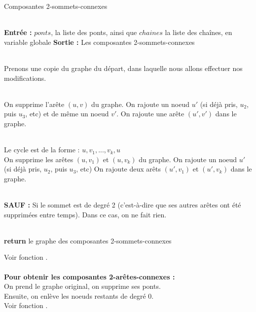 \documentclass{article}      %
\begin{document}
\begin{algorithm}[H] \caption{Composantes 2-sommets-connexes}
\begin{algorithmic}

\\ \State \textbf{Entrée :} $ponts$, la liste des ponts, ainsi que $chaines$ la liste des chaînes, en variable globale
\State \textbf{Sortie :} Les composantes 2-sommets-connexes

\\ \State Prenons une copie du graphe du départ, dans laquelle nous allons effectuer nos modifications.

\\ 
    \State On supprime l'arête $(u, v)$ du graphe.
    \State On rajoute un noeud $u'$ (si déjà pris, $u_2$, puis $u_3$, etc) et de même un noeud $v'$.
    \State On rajoute une arête $(u', v')$ dans le graphe.
\EndFor

\\ 
    \State Le cycle est de la forme : $u, v_1, ..., v_k, u$
    \\\State On supprime les arêtes $(u, v_1)$ et $(u, v_k)$ du graphe.        
    \State On rajoute un noeud $u'$ (si déjà pris, $u_2$, puis $u_3$, etc)
    \State On rajoute deux arêts $(u', v_1)$ et $(u', v_k)$ dans le graphe.
    
    \\\State \textbf{SAUF :} 
    \State Si le sommet est de degré 2 (c'est-à-dire que ses autres arêtes ont été supprimées entre temps).
    \State Dans ce cas, on ne fait rien.
\EndFor

\\ \State \textbf{return} le graphe des composantes 2-sommets-connexes
\end{algorithmic}
\end{algorithm}


Voir fonction .
%
%
\\\\\textbf{Pour obtenir les composantes 2-arêtes-connexes :}
\\On prend le graphe original, on supprime ses ponts.
\\Ensuite, on enlève les noeuds restants de degré 0.
\\Voir fonction .
%
\end{document}
